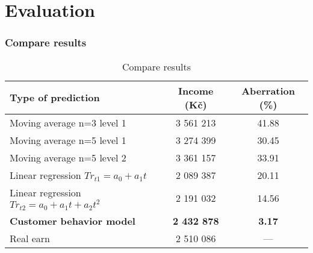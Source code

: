 
\chapter{Evaluation}
\label{evaluation}
\subsection{Compare results}
\begin{table}[h!]
    \begin{center}
        \begin{tabular}{ | l | c | c |}
            \hline
            {\textbf{Type of prediction}} & \textbf{Income (Kč)} & \textbf{Aberration (\%)}\\
            \hline
            Moving average n=3 level 1 & 3 561 213 & 41.88\\
            Moving average n=5 level 1 & 3 274 399 & 30.45\\
            Moving average n=5 level 2 & 3 361 157 & 33.91\\
            Linear regression $Tr_{t1}=a_0+a_1t$ & 2 089 387 & 20.11\\
            Linear regression $Tr_{t2}=a_0+a_1t+a_2t^2$ & 2 191 032 & 14.56\\
            \textbf{Customer behavior model} & \textbf{2 432 878} & \textbf{3.17}\\
            Real earn & 2 510 086 & ---\\
            \hline
        \end{tabular}
    \end{center}
    \caption{Compare results}
    \label{Compare results}
\end{table}
\newpage
